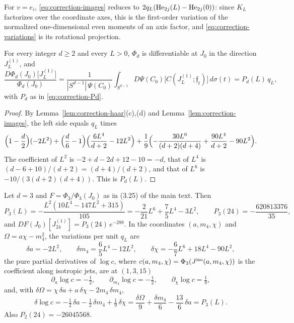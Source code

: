 For $v=e_i$, \eqref{eq:correction-images} reduces to $2q_L(\operatorname{He}_{2j}(L)-\operatorname{He}_{2j}(0))$: since $K_L$ factorizes over the coordinate axes, this is the first-order variation of the normalized one-dimensional even moments of an axis factor, and \eqref{eq:correction-variations} is its rotational projection.

\begin{proposition}\label{prop:correction-firstvar}
For every integer $d\ge2$ and every $L>0$, $\Phi_d$ is differentiable at $J_0$ in the direction $J^{(1)}_L$, and
\begin{equation}\label{eq:correction-firstvar}
\frac{D\Phi_d(J_0)\bigl[J^{(1)}_L\bigr]}{\Phi_d(J_0)}=\frac{1}{|S^{d-1}|\,\Psi(C_0)}\int_{S^{d-1}}D\Psi(C_0)\bigl[C(J^{(1)}_L;\mathfrak f_t)\bigr]\,d\sigma(t)=P_d(L)\,q_L ,
\end{equation}
with $P_d$ as in \eqref{eq:correction-Pd}.
\end{proposition}

\begin{proof}
By Lemma~\ref{lem:correction-haar}(c),(d) and Lemma~\ref{lem:correction-images}, the left side equals $q_L$ times
\[
\Bigl(1-\frac d2\Bigr)(-2L^2)+\Bigl(\frac d6-1\Bigr)\Bigl(\frac{6L^4}{d+2}-12L^2\Bigr)+\frac19\Bigl(-\frac{30L^6}{(d+2)(d+4)}+\frac{90L^4}{d+2}-90L^2\Bigr).
\]
The coefficient of $L^2$ is $-2+d-2d+12-10=-d$, that of $L^4$ is $(d-6+10)/(d+2)=(d+4)/(d+2)$, and that of $L^6$ is $-10/(3(d+2)(d+4))$. This is $P_d(L)$.
\end{proof}

\begin{corollary}\label{cor:correction-firstvar3}
Let $d=3$ and $F=\Phi_3/\Phi_3(J_0)$ as in (3.25) of the main text. Then
\begin{equation}\label{eq:correction-P3}
P_3(L)=-\frac{L^2(10L^4-147L^2+315)}{105}=-\frac2{21}L^6+\frac75L^4-3L^2,\qquad P_3(24)=-\frac{620813376}{35},
\end{equation}
and $DF(J_0)[J^{(1)}_{24}]=P_3(24)\,e^{-288}$. In the coordinates $(a,m_4,\chi)$ and $\Omega=a\chi-m_4^2$, the variations per unit $q_L$ are
\begin{equation}\label{eq:correction-var3}
\delta a=-2L^2,\qquad \delta m_4=\frac65L^4-12L^2,\qquad \delta\chi=-\frac67L^6+18L^4-90L^2,
\end{equation}
the pure partial derivatives of $\log c$, where $c(a,m_4,\chi)=\Phi_3(J^{\rm iso}(a,m_4,\chi))$ is the coefficient along isotropic jets, are at $(1,3,15)$
\begin{equation}\label{eq:correction-partials}
\partial_a\log c=-\tfrac12,\qquad\partial_{m_4}\log c=-\tfrac12,\qquad\partial_\chi\log c=\tfrac19,
\end{equation}
and, with $\delta\Omega=\chi\,\delta a+a\,\delta\chi-2m_4\,\delta m_4$,
\begin{equation}\label{eq:correction-regroup}
\delta\log c=-\tfrac12\,\delta a-\tfrac12\,\delta m_4+\tfrac19\,\delta\chi=\frac{\delta\Omega}9+\frac{\delta m_4}6-\frac{13}6\,\delta a=P_3(L).
\end{equation}
Also $P_2(24)=-26045568$.
\end{corollary}

